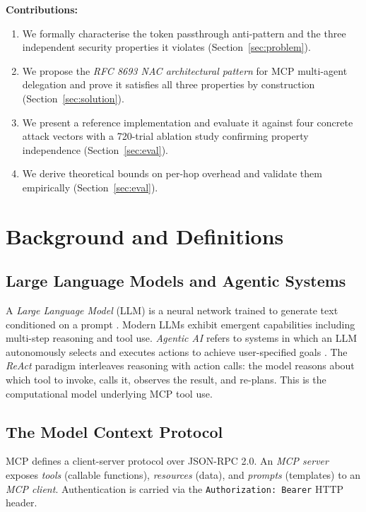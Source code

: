 \documentclass[journal]{IEEEtran}
\begin{document}
\textbf{Contributions:}
\begin{enumerate}
  \item We formally characterise the token passthrough anti-pattern and the three
        independent security properties it violates
        (Section~\ref{sec:problem}).
  \item We propose the \textit{RFC 8693 NAC architectural pattern} for MCP
        multi-agent delegation and prove it satisfies all three properties by
        construction (Section~\ref{sec:solution}).
  \item We present a reference implementation and evaluate it against four
        concrete attack vectors with a 720-trial ablation study confirming
        property independence (Section~\ref{sec:eval}).
  \item We derive theoretical bounds on per-hop overhead and validate them
        empirically (Section~\ref{sec:eval}).
\end{enumerate}

\section{Background and Definitions}
\label{sec:background}

\subsection{Large Language Models and Agentic Systems}

A \textit{Large Language Model} (LLM) is a neural network trained to generate
text conditioned on a prompt \cite{vaswani2017}. Modern LLMs exhibit emergent
capabilities including multi-step reasoning and tool use. \textit{Agentic AI}
refers to systems in which an LLM autonomously selects and executes actions to
achieve user-specified goals \cite{wang2024survey}. The \textit{ReAct} paradigm
\cite{yao2022react} interleaves reasoning with action calls: the model reasons
about which tool to invoke, calls it, observes the result, and re-plans. This
is the computational model underlying MCP tool use.

\subsection{The Model Context Protocol}

MCP \cite{mcp_spec} defines a client-server protocol over JSON-RPC 2.0. An
\textit{MCP server} exposes \textit{tools} (callable functions), \textit{resources}
(data), and \textit{prompts} (templates) to an \textit{MCP client}. Authentication
is carried via the \texttt{Authorization: Bearer} HTTP header.
\end{document}
